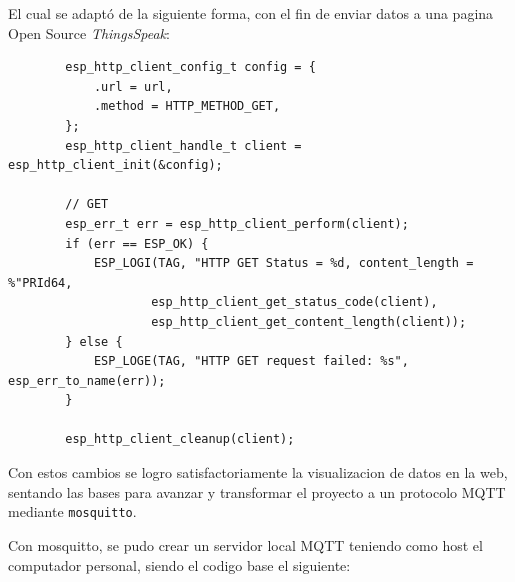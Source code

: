 \documentclass[12pt, a4paper]{article}
\begin{document}
    El cual se adaptó de la siguiente forma, con el fin de enviar datos a una pagina Open Source \textit{ThingsSpeak}:

    \begin{verbatim}
        esp_http_client_config_t config = {
            .url = url,
            .method = HTTP_METHOD_GET,
        };
        esp_http_client_handle_t client = esp_http_client_init(&config);
    
        // GET
        esp_err_t err = esp_http_client_perform(client);
        if (err == ESP_OK) {
            ESP_LOGI(TAG, "HTTP GET Status = %d, content_length = %"PRId64,
                    esp_http_client_get_status_code(client),
                    esp_http_client_get_content_length(client));
        } else {
            ESP_LOGE(TAG, "HTTP GET request failed: %s", esp_err_to_name(err));
        }
    
        esp_http_client_cleanup(client);
    \end{verbatim}

    Con estos cambios se logro satisfactoriamente la visualizacion de datos en la web, sentando las bases para avanzar y transformar el proyecto a un protocolo MQTT mediante \texttt{mosquitto}.

    Con mosquitto, se pudo crear un servidor local MQTT teniendo como host el computador personal, siendo el codigo base el siguiente:
\end{document}
